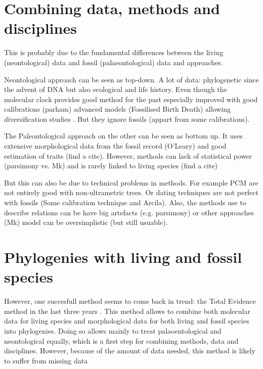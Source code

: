 \section{Combining data, methods and disciplines}
This is probably due to the fundamental differences between the living (neontological) data and fossil (palaeontological) data and approaches.

Neontological approach can be seen as top-down.
A lot of data: phylogenetic since the advent of DNA but also ecological and life history.
Even though the molecular clock \citep{zuckerkandl1965} provides good method for the past
especially improved with good calibrations (parham) advanced models (Fossilised Birth Death) allowing diversification studies \citep{Stadler12042011}.
But they ignore fossils (appart from some calibrations).

The Paleontological approach on the other can be seen as bottom up.
It uses extensive morphological data from the fossil record \citep[e.g. phenomics;][]{}(O'Leary) and good estimation of traits (find a cite).
However, methods can lack of statistical power (parsimony vs. Mk) and is rarely linked to living species (find a cite)

But this can also be due to technical problems in methods.
For example PCM are not entirely good with non-ultrametric trees.
Or dating techniques are not perfect with fossils (Some calibration technique and Arcila).
Also, the methods use to describe relations can be have big artefacts (e.g. parsimony) or other approaches (Mk) model can be oversimplistic (but still usuable).


\section{Phylogenies with living and fossil species}
However, one succesfull method seems to come back in trend: the Total Evidence method \citep{eernissetaxonomic1993} in the last three years \citep{ronquista2012,slaterphylogenetic2013,Wood01032013,schragocombining2013,beckancient2014,Arcila2015131,Dembo2015}.
This method allows to combine both molecular data for living species and morphological data for both living and fossil species into phylogenies.
Doing so allows mainly to treat palaoentological and neontological equally, which is a first step for combining methods, data and disciplines.
However, because of the amount of data needed, this method is likely to suffer from missing data

